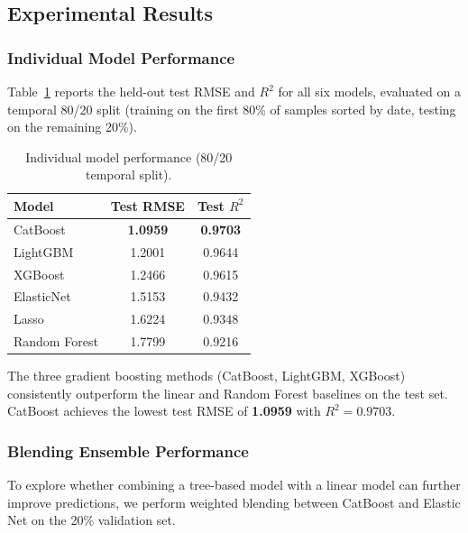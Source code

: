 \subsection{Experimental Results}

\subsubsection{Individual Model Performance}

Table~\ref{tab:model_results} reports the held-out test RMSE and $R^2$ for
all six models, evaluated on a temporal 80/20 split (training on the first
80\% of samples sorted by date, testing on the remaining 20\%).

\begin{table}[htbp]
  \centering
  \caption{Individual model performance (80/20 temporal split).}
  \label{tab:model_results}
  \begin{tabular}{lcc}
    \toprule
    Model         & Test RMSE & Test $R^2$ \\
    \midrule
    CatBoost      & \textbf{1.0959} & \textbf{0.9703} \\
    LightGBM      & 1.2001  & 0.9644 \\
    XGBoost       & 1.2466  & 0.9615 \\
    ElasticNet    & 1.5153  & 0.9432 \\
    Lasso         & 1.6224  & 0.9348 \\
    Random Forest & 1.7799  & 0.9216 \\
    \bottomrule
  \end{tabular}
\end{table}

The three gradient boosting methods (CatBoost, LightGBM, XGBoost) consistently
outperform the linear and Random Forest baselines on the test set.
CatBoost achieves the lowest test RMSE of \textbf{1.0959} with $R^2 = 0.9703$.

\subsubsection{Blending Ensemble Performance}

To explore whether combining a tree-based model with a linear model can
further improve predictions, we perform weighted blending between CatBoost
and Elastic Net on the 20\% validation set.


